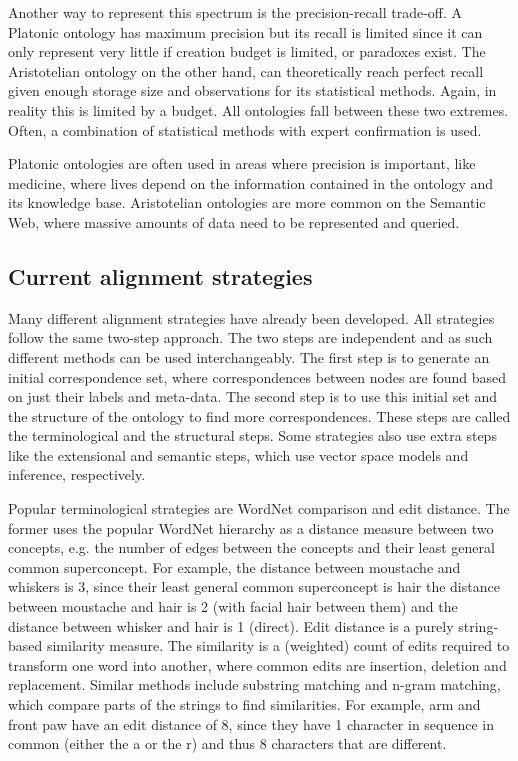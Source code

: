 \documentclass{article}
\begin{document}
 Another way to represent this spectrum is the precision-recall trade-off. A Platonic ontology has maximum precision but its recall is limited since it can only represent very little if creation budget is limited, or paradoxes exist. The Aristotelian ontology on the other hand, can theoretically reach perfect recall given enough storage size and observations for its statistical methods. Again, in reality this is limited by a budget. All ontologies fall between these two extremes. Often, a combination of statistical methods with expert confirmation is used.
 
 Platonic ontologies are often used in areas where precision is important, like medicine, where lives depend on the information contained in the ontology and its knowledge base. Aristotelian ontologies are more common on the Semantic Web, where massive amounts of data need to be represented and queried.
 
 \subsection{Current alignment strategies} \label{strategies}
 Many different alignment strategies have already been developed. All strategies follow the same two-step approach. The two steps are independent and as such different methods can be used interchangeably. The first step is to generate an initial correspondence set, where correspondences between nodes are found based on just their labels and meta-data. The second step is to use this initial set and the structure of the ontology to find more correspondences. These steps are called the terminological and the structural steps. Some strategies also use extra steps like the extensional and semantic steps, which use vector space models and inference, respectively\cite{future}.
 
 Popular terminological strategies are WordNet comparison and edit distance. The former uses the popular WordNet hierarchy as a distance measure between two concepts, e.g. the number of edges between the concepts and their least general common superconcept\cite{lin2008}.
 For example, the distance between moustache and whiskers is 3, since their least general common superconcept is hair the distance between moustache and hair is 2 (with facial hair between them) and the distance between whisker and hair is 1 (direct).
 Edit distance is a purely string-based similarity measure. The similarity is a (weighted) count of edits required to transform one word into another, where common edits are insertion, deletion and replacement. Similar methods include substring matching and n-gram matching, which compare parts of the strings to find similarities\cite{singh2014, levenshtein}.
 For example, arm and front paw have an edit distance of 8, since they have 1 character in sequence in common (either the a or the r) and thus 8 characters that are different.
\end{document}
